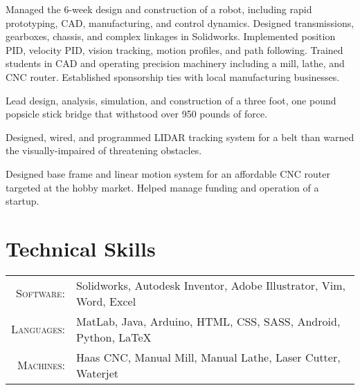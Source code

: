 \documentclass{resume_template}
\begin{document}
Managed the 6-week design and construction of a robot, including rapid prototyping, CAD, manufacturing, and control dynamics. Designed transmissions, gearboxes, chassis, and complex linkages in Solidworks. Implemented position PID, velocity PID, vision tracking, motion profiles, and path following. Trained students in CAD and operating precision machinery including a mill, lathe, and CNC router. Established sponsorship ties with local manufacturing businesses.

Lead design, analysis, simulation, and construction of a three foot, one pound popsicle stick bridge that withstood over 950 pounds of force.


Designed, wired, and programmed LIDAR tracking system for a belt than warned the visually-impaired of threatening obstacles.

Designed base frame and linear motion system for an affordable CNC router targeted at the hobby market. Helped manage funding and operation of a startup.

\section{Technical Skills}
\begin{tabular}{rl}
  \textsc{Software:}   & Solidworks, Autodesk Inventor, Adobe Illustrator, Vim, Word, Excel\\
  \textsc{Languages:}  & MatLab, Java, Arduino, HTML, CSS, SASS, Android, Python, \LaTeX\\
  \textsc{Machines:}   & Haas CNC, Manual Mill, Manual Lathe, Laser Cutter, Waterjet\\
\end{tabular}
\end{document}
